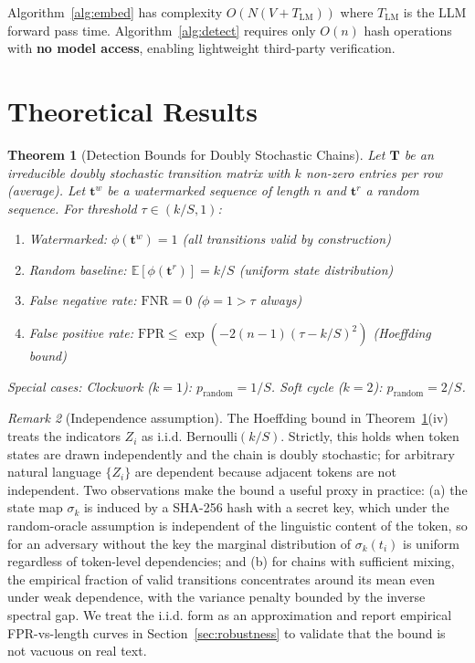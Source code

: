 \documentclass[11pt]{article}
\newtheorem{theorem}{Theorem}[section]
\theoremstyle{definition}
\theoremstyle{remark}
\newtheorem{remark}[theorem]{Remark}
\begin{document}
Algorithm~\ref{alg:embed} has complexity $O(N(V + T_{\text{LM}}))$ where $T_{\text{LM}}$ is the LLM forward pass time. Algorithm~\ref{alg:detect} requires only $O(n)$ hash operations with \textbf{no model access}, enabling lightweight third-party verification.

\section{Theoretical Results}
\label{sec:theory}

\begin{theorem}[Detection Bounds for Doubly Stochastic Chains]
\label{thm:detection}
Let $\mathbf{T}$ be an irreducible doubly stochastic transition matrix with $k$ non-zero entries per row (average). Let $\mathbf{t}^w$ be a watermarked sequence of length $n$ and $\mathbf{t}^r$ a random sequence. For threshold $\tau \in (k/S, 1)$:
\begin{enumerate}[label=(\roman*), itemsep=0pt, topsep=2pt]
    \item Watermarked: $\phi(\mathbf{t}^w) = 1$ \hfill (all transitions valid by construction)
    \item Random baseline: $\mathbb{E}[\phi(\mathbf{t}^r)] = k/S$ \hfill (uniform state distribution)
    \item False negative rate: $\text{FNR} = 0$ \hfill ($\phi = 1 > \tau$ always)
    \item False positive rate: $\text{FPR} \leq \exp(-2(n{-}1)(\tau - k/S)^2)$ \hfill (Hoeffding bound)
\end{enumerate}
\textit{Special cases:} Clockwork ($k{=}1$): $p_{\text{random}} = 1/S$. Soft cycle ($k{=}2$): $p_{\text{random}} = 2/S$.
\end{theorem}

\begin{remark}[Independence assumption]
\label{rem:iid}
The Hoeffding bound in Theorem~\ref{thm:detection}(iv) treats the indicators $Z_i$ as i.i.d. Bernoulli$(k/S)$. Strictly, this holds when token states are drawn independently and the chain is doubly stochastic; for arbitrary natural language $\{Z_i\}$ are dependent because adjacent tokens are not independent. Two observations make the bound a useful proxy in practice:
(a) the state map $\sigma_k$ is induced by a SHA-256 hash with a secret key, which under the random-oracle assumption is independent of the linguistic content of the token, so for an adversary without the key the marginal distribution of $\sigma_k(t_i)$ is uniform regardless of token-level dependencies; and
(b) for chains with sufficient mixing, the empirical fraction of valid transitions concentrates around its mean even under weak dependence, with the variance penalty bounded by the inverse spectral gap. We treat the i.i.d. form as an approximation and report empirical FPR-vs-length curves in Section~\ref{sec:robustness} to validate that the bound is not vacuous on real text.
\end{remark}
\end{document}
